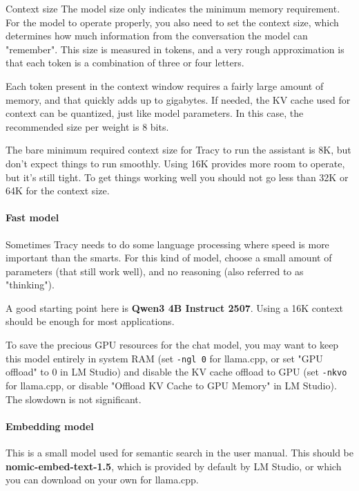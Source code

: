 \documentclass[hidelinks,titlepage,a4paper,twoside]{article}
\begin{document}
\begin{bclogo}[
noborder=true,
couleur=black!5,
logo=\bclampe
]{Context size}
The model size only indicates the minimum memory requirement. For the model to operate properly, you also need to set the context size, which determines how much information from the conversation the model can "remember". This size is measured in tokens, and a very rough approximation is that each token is a combination of three or four letters.

Each token present in the context window requires a fairly large amount of memory, and that quickly adds up to gigabytes. If needed, the KV cache used for context can be quantized, just like model parameters. In this case, the recommended size per weight is 8 bits.

The bare minimum required context size for Tracy to run the assistant is 8K, but don't expect things to run smoothly. Using 16K provides more room to operate, but it's still tight. To get things working well you should not go less than 32K or 64K for the context size.
\end{bclogo}

\paragraph{Fast model}

Sometimes Tracy needs to do some language processing where speed is more important than the smarts. For this kind of model, choose a small amount of parameters (that still work well), and no reasoning (also referred to as "thinking").

A good starting point here is \textbf{Qwen3 4B Instruct 2507}. Using a 16K context should be enough for most applications.

To save the precious GPU resources for the chat model, you may want to keep this model entirely in system RAM (set \texttt{-ngl 0} for llama.cpp, or set "GPU offload" to 0 in LM Studio) and disable the KV cache offload to GPU (set \texttt{-nkvo} for llama.cpp, or disable "Offload KV Cache to GPU Memory" in LM Studio). The slowdown is not significant.

\paragraph{Embedding model}

This is a small model used for semantic search in the user manual. This should be \textbf{nomic-embed-text-1.5}, which is provided by default by LM Studio, or which you can download on your own for llama.cpp.
\end{document}

